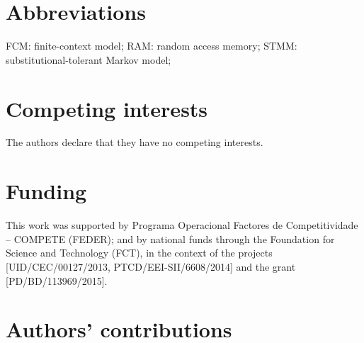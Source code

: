 \clearpage
\section{Abbreviations}
FCM: finite-context model; RAM: random access memory; STMM: substitutional-tolerant Markov model;

\section{Competing interests}
The authors declare that they have no competing interests.

\section{Funding}
This work was supported by Programa Operacional Factores de Competitividade -- COMPETE (FEDER); and by national funds through the Foundation for Science and Technology (FCT), in the context of the projects [UID/CEC/00127/2013, PTCD/EEI-SII/6608/2014] and the grant [PD/BD/113969/2015].

\section{Authors' contributions}